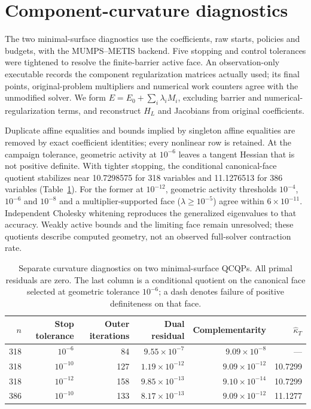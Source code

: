 \documentclass[pdflatex,sn-mathphys-num]{sn-jnl}
\theoremstyle{thmstyleone}
\theoremstyle{thmstylethree}
\begin{document}
\section{Component-curvature diagnostics}\label{app:curvature-diagnostics}
The two minimal-surface diagnostics use the coefficients, raw starts,
policies and budgets, with the MUMPS--METIS backend. Five stopping and control tolerances were tightened to
resolve the finite-barrier active face. An observation-only executable records
the component regularization matrices actually used; its final points,
original-problem multipliers and
numerical work counters agree with the unmodified solver. We form
$E=E_0+\sum_i\lambda_iM_i$, excluding barrier and numerical-regularization terms,
and reconstruct $H_L$ and Jacobians from original coefficients.

Duplicate affine equalities and bounds implied by singleton affine equalities
are removed by exact coefficient identities; every nonlinear row is retained.
At the campaign tolerance, geometric activity at $10^{-6}$ leaves a tangent
Hessian that is not positive definite. With tighter stopping, the conditional
canonical-face quotient stabilizes near 10.7298575 for 318 variables and
11.1276513 for 386 variables (Table~\ref{tab:kappa-diagnostic}). For the former
at $10^{-12}$, geometric activity thresholds $10^{-4}$, $10^{-6}$ and $10^{-8}$
and a multiplier-supported face ($\lambda\ge10^{-5}$) agree within
$6\times10^{-11}$. Independent Cholesky whitening reproduces the generalized
eigenvalues to that accuracy. Weakly active bounds and the limiting face remain
unresolved; these quotients describe computed geometry, not an observed
full-solver contraction rate.


\begin{table}[t]
\centering\small
\setlength{\tabcolsep}{4pt}
\caption{Separate curvature diagnostics on two minimal-surface QCQPs. All primal residuals are zero. The last column is a conditional quotient on the canonical face selected at geometric tolerance $10^{-6}$; a dash denotes failure of positive definiteness on that face.}
\label{tab:kappa-diagnostic}
\begin{tabular}{rrrrrr}
\toprule
$n$ & Stop tolerance & Outer iterations & Dual residual & Complementarity & $\widehat\kappa_T$\\
\midrule
318 & $10^{-6}$ & 84 & $9.55\times10^{-7}$ & $9.09\times10^{-8}$ & ---\\
318 & $10^{-10}$ & 127 & $1.19\times10^{-12}$ & $9.09\times10^{-12}$ & 10.7299\\
318 & $10^{-12}$ & 158 & $9.85\times10^{-13}$ & $9.10\times10^{-14}$ & 10.7299\\
386 & $10^{-10}$ & 133 & $8.17\times10^{-13}$ & $9.09\times10^{-12}$ & 11.1277\\
\bottomrule
\end{tabular}
\end{table}
\end{document}
